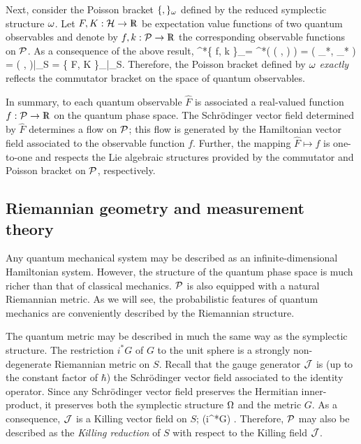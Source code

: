 Next, consider the Poisson bracket $\{ , \}_\w$ defined by the reduced
symplectic structure $\w$.  Let $F, K :\H \rightarrow \R$ be
expectation value functions of two quantum observables and denote by
$f,k:\P \rightarrow \R$ the corresponding observable functions on
$\P$.  As a consequence of the above result,
%
\be \label{pb_on_P}
\pi^*\{ f, k \}_\w = \pi^*( \w( ,  ) )
= \w( \pi_*, \pi_* )
= \W( ,  )\big|_S
= \{ F, K \}_\W\big|_S.
\ee
%
Therefore, the Poisson bracket defined by $\w$ {\em exactly} reflects
the commutator bracket on the space of quantum observables.

In summary, to each quantum observable $\hat{F}$ is associated a
real-valued function $f:\P \rightarrow \R$ on the quantum phase space.
The Schr\"odinger vector field determined by $\hat{F}$ determines a
flow on $\P$; this flow is generated by the Hamiltonian vector field
associated to the observable function $f$.  Further, the mapping
$\hat{F} \mapsto f$ is one-to-one and respects the Lie algebraic
structures provided by the commutator and Poisson bracket on $\P$,
respectively.


\subsection{Riemannian geometry and measurement theory}
\label{sec2.C}

Any quantum mechanical system may be described as an
infinite-dimensional Hamiltonian system.  However, the structure of
the quantum phase space is much richer than that of classical
mechanics.  $\P$ is also equipped with a natural Riemannian metric.
As we will see, the probabilistic features of quantum mechanics are
conveniently described by the Riemannian structure.

The quantum metric may be described in much the same way as the
symplectic structure.  The restriction $i^*G$ of $G$ to the unit
sphere is a strongly non-degenerate Riemannian metric on $S$.  Recall
that the gauge generator $\J$ is (up to the constant factor of
$\hbar$) the Schr\"odinger vector field associated to the identity
operator.  Since any Schr\"odinger vector field preserves the
Hermitian inner-product, it preserves both the symplectic structure
$\W$ and the metric $G$.  As a consequence, $\J$ is a Killing vector
field on $S$;
%
\be
	\lie{\J} (i^*G) .
\ee
%
Therefore, $\P$ may also be described as the {\em Killing
reduction}\cite{geroch} of $S$ with respect to the Killing field $\J$.

